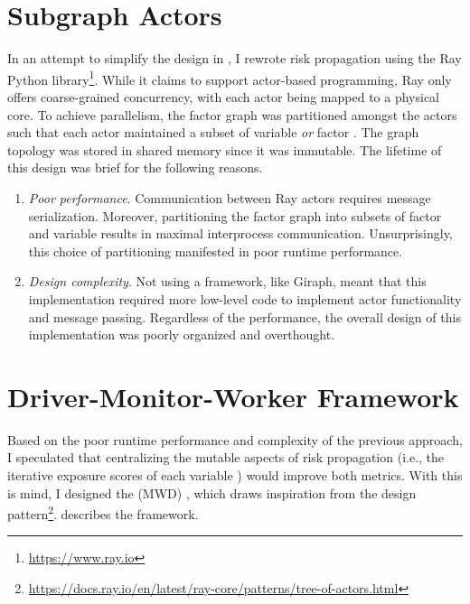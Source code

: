 \section{Subgraph Actors}\label{sec:subgraph-actors}

In an attempt to simplify the design in , I rewrote risk propagation using the Ray Python library\footnote{\url{https://www.ray.io}}. While it claims to support actor-based programming, Ray only offers coarse-grained concurrency, with each actor being mapped to a physical core. To achieve parallelism, the factor graph was partitioned amongst the actors such that each actor maintained a subset of variable \verticesName{} \emph{or} factor \verticesName. The graph topology was stored in shared memory since it was immutable. The lifetime of this design was brief for the following reasons.
  \begin{enumerate}
    \item \emph{Poor performance}. Communication between Ray actors requires message serialization. Moreover, partitioning the factor graph into subsets of factor \verticesName{} and variable \verticesName{} results in maximal interprocess communication. Unsurprisingly, this choice of partitioning manifested in poor runtime performance.
    \item \emph{Design complexity}. Not using a framework, like Giraph, meant that this implementation required more low-level code to implement actor functionality and message passing. Regardless of the performance, the overall design of this implementation was poorly organized and overthought.
  \end{enumerate}

\section{Driver-Monitor-Worker Framework}\label{sec:mwd-framework}

Based on the poor runtime performance and complexity of the previous approach, I speculated that centralizing the mutable aspects of risk propagation (i.e., the iterative exposure scores of each variable \vertexName) would improve both metrics. With this is mind, I designed the  (MWD) , which draws inspiration from the  design pattern\footnote{\url{https://docs.ray.io/en/latest/ray-core/patterns/tree-of-actors.html}}.  describes the framework.

